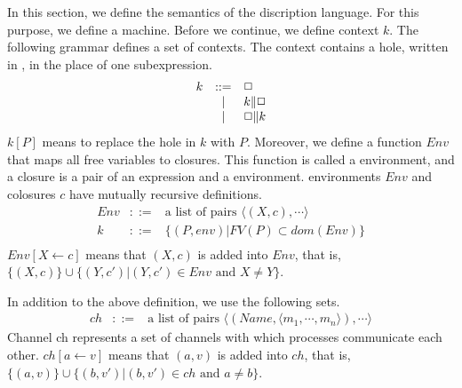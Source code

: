 In this section, we define the semantics of the discription language.
For this purpose, we define a machine.
Before we continue, we define context \(k\).
The following grammar defines a set of contexts.
The context contains a hole, written in \hole, in the place of one subexpression.
  \begin{displaymath}
    \begin{array}{lcl}
k     &::=& \mbox{$\Box$} \\
      & | & k\|\mbox{$\Box$}\\
      & | & \mbox{$\Box$}\|k
    \end{array}
  \end{displaymath}
$k[P]$ means to replace the hole in $k$ with $P$.
Moreover, we define a function $Env$ that maps all free variables to closures.
This function is called a environment, and a closure is a pair of an expression and a environment.
environments \(Env\) and colosures \(c\) have mutually recursive definitions.
  \begin{displaymath}
    \begin{array}{rcl}
Env &::=& \mbox{a list of pairs }\langle(X,c),\cdots\rangle\\
k &::=& \{(P,env)|FV(P)\subset dom(Env)\}\\
    \end{array}
  \end{displaymath}
\(Env[X\leftarrow c]\) means that \((X,c)\) is added into \(Env\), that is, 
\(\{(X,c)\}\cup\{(Y,c')|(Y,c')\in Env \mbox{ and } X\neq Y\}\).

In addition to the above definition, we use the following sets.
  \begin{displaymath}
    \begin{array}{rcl}
ch &::=&\mbox{a list of pairs }\langle(Name,\langle m_1,\cdots,m_n\rangle),\cdots\rangle
    \end{array}
  \end{displaymath}
Channel ch represents a set of channels with which processes communicate each other.
\(ch[a\leftarrow v]\) means that \((a,v)\) is added into \(ch\), that is, 
\(\{(a,v)\}\cup\{(b,v')|(b,v')\in ch \mbox{ and } a\neq b\}\).

